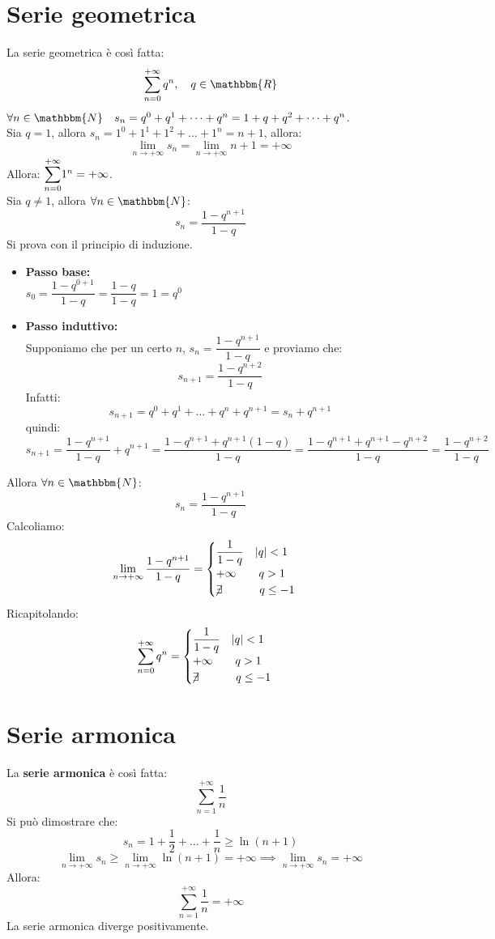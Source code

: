 \documentclass[12pt]{report}
\begin{document}
 	\section{Serie geometrica}
 		La serie geometrica è così fatta:
 		\[
 		\sum_{n=0}^{+\infty}q^n, \quad q \in \mathbbm{R}
 		\]
 		$\forall n \in \mathbbm{N} \quad s_n = q^0 + q^1 + \dots + q^n = 1 + q + q^2 + \dots + q^n$. \\
 		Sia $q = 1$, allora $s_n = 1^0 + 1^1+ 1^2 + \dots + 1^n = n + 1$, allora:
 		\[
 		\lim_{n \to +\infty}s_n = \lim_{n \to +\infty}n+1=+\infty
 		\]
 		Allora: $\mathlarger{\sum_{n=0}^{+\infty}}1^n = +\infty$. \\
 		Sia $q \neq 1$, allora $\forall n \in \mathbbm{N}$:
 		\[
 		s_n = \dfrac{1- q^{n+1}}{1-q}
 		\]
 		Si prova con il principio di induzione.
 		\begin{itemize}
 			\item \textbf{Passo base:} \\
 			$s_0 = \dfrac{1-q^{0+1}}{1-q} = \dfrac{1 - q}{1 - q} = 1 = q^0$
 			\item \textbf{Passo induttivo:} \\
 			Supponiamo che per un certo $n$, $s_n = \dfrac{1-q^{n+1}}{1-q}$ e proviamo che: \[s_{n+1} = \dfrac{1 - q^{n +2}}{1 - q}\] Infatti:
 			\[
 			s_{n+1} = q^0 + q^1 + \dots + q^n + q^{n+1} = s_n + q^{n+1}
 			\]
 			quindi:
 			\[
 			s_{n+1} = \dfrac{1-q^{n+1}}{1-q} + q^{n+1}=\dfrac{1-q^{n+1}+q^{n+1}(1-q)}{1 - q}=  \dfrac{1 - q^{n+ 1} + q^{n+1} - q^{n+2}}{1-q} = \dfrac{1 - q^{n+2}}{1 - q}
 			\]
 		\end{itemize}
 		Allora $\forall n\in \mathbbm{N}$:
 		\[
 		s_n = \dfrac{1-q^{n+1}}{1-q}
 		\]
 		Calcoliamo:
 		\[
 		\lim_{n \to +\infty}\dfrac{1-q^{n+1}}{1-q}=\begin{cases}
 			\dfrac{1}{1 - q}\quad |q| < 1 \\
 			+\infty \quad\quad q > 1 \\
 			\centernot{\exists}\quad\quad\quad q \leq -1
 		\end{cases}
 		\]
 		Ricapitolando:
 		\[
 		\sum_{n=0}^{+\infty}q^n = \begin{cases}
 			\dfrac{1}{1 - q}\quad |q| < 1 \\
 			+\infty \quad\quad q > 1 \\
 			\centernot{\exists}\quad\quad\quad q \leq -1
 		\end{cases}
 		\]
 		\section{Serie armonica}
 		La \textbf{serie armonica} è così fatta:
 		\[
 		\sum_{n=1}^{+\infty}\dfrac{1}{n}
 		\]
 		Si può dimostrare che:
 		\[
 		s_n = 1 + \frac{1}{2} + \dots + \frac{1}{n}  \geq \ln(n + 1)
 		\]
 		\[
 		\lim_{n \to +\infty}s_n \geq \lim_{n \to +\infty}\ln(n+1) = +\infty \implies \lim_{n \to +\infty}s_n = +\infty
 		\]
 		Allora:
 		\[
 		\sum_{n=1}^{+\infty}\frac{1}{n} = +\infty
 		\]
 		La serie armonica diverge positivamente.
\end{document}
